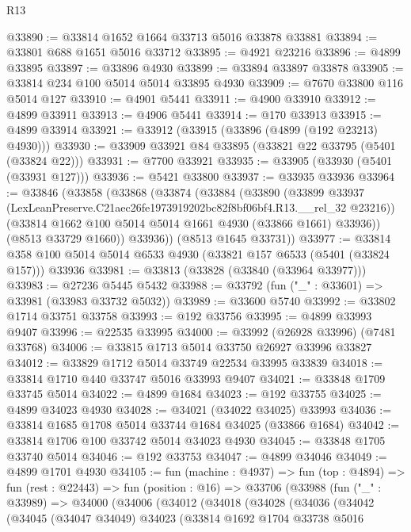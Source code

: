 \begin{lexlean}{R13}
\begin{coremodule}
@33890 := @33814 @1652 @1664 @33713 @5016 @33878 @33881
@33894 := @33801 @688 @1651 @5016 @33712
@33895 := @4921 @23216
@33896 := @4899 @33895
@33897 := @33896 @4930
@33899 := @33894 @33897 @33878
@33905 := @33814 @234 @100 @5014 @5014 @33895 @4930
@33909 := @7670 @33800 @116 @5014 @127
@33910 := @4901 @5441
@33911 := @4900 @33910
@33912 := @4899 @33911
@33913 := @4906 @5441
@33914 := @170 @33913
@33915 := @4899 @33914
@33921 := @33912 (@33915 (@33896 (@4899 (@192 @23213) @4930)))
@33930 := @33909 @33921 @84 @33895 (@33821 @22 @33795 (@5401 (@33824 @22)))
@33931 := @7700 @33921
@33935 := @33905 (@33930 (@5401 (@33931 @127)))
@33936 := @5421 @33800
@33937 := @33935 @33936
@33964 := @33846
    (@33858
      (@33868
        (@33874
          (@33884
            (@33890
              (@33899
                @33937
                (LexLeanPreserve.C21aec26fe1973919202bc82f8bf06bf4.R13.__rel_32 @23216))
              (@33814 @1662 @100 @5014 @5014 @1661 @4930 (@33866 @1661) @33936))
            (@8513 @33729 @1660))
          @33936))
      (@8513 @1645 @33731))
@33977 := @33814 @358 @100 @5014 @5014 @6533 @4930 (@33821 @157 @6533 (@5401 (@33824 @157))) @33936
@33981 := @33813 (@33828 (@33840 (@33964 @33977)))
@33983 := @27236 @5445 @5432
@33988 := @33792 (fun ("_" : @33601) => @33981 (@33983 @33732 @5032))
@33989 := @33600 @5740
@33992 := @33802 @1714 @33751 @33758
@33993 := @192 @33756
@33995 := @4899 @33993 @9407
@33996 := @22535 @33995
@34000 := @33992 (@26928 @33996) (@7481 @33768)
@34006 := @33815 @1713 @5014 @33750 @26927 @33996 @33827
@34012 := @33829 @1712 @5014 @33749 @22534 @33995 @33839
@34018 := @33814 @1710 @440 @33747 @5016 @33993 @9407
@34021 := @33848 @1709 @33745 @5014
@34022 := @4899 @1684
@34023 := @192 @33755
@34025 := @4899 @34023 @4930
@34028 := @34021 (@34022 @34025) @33993
@34036 := @33814 @1685 @1708 @5014 @33744 @1684 @34025 (@33866 @1684)
@34042 := @33814 @1706 @100 @33742 @5014 @34023 @4930
@34045 := @33848 @1705 @33740 @5014
@34046 := @192 @33753
@34047 := @4899 @34046
@34049 := @4899 @1701 @4930
@34105 := fun (machine : @4937) =>
  fun (top : @4894) =>
  fun (rest : @22443) =>
  fun (position : @16) =>
  @33706
    (@33988
      (fun ("_" : @33989) =>
      @34000
        (@34006
          (@34012
            (@34018
              (@34028
                (@34036
                  (@34042
                    (@34045
                      (@34047 @34049)
                      @34023
                      (@33814
                        @1692
                        @1704
                        @33738
                        @5016

\end{coremodule}
\end{lexlean}
